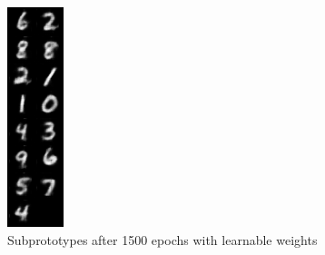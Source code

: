 \begin{figure}
    \centering
    \includegraphics{img/subprot44.png}
    \caption{Subprototypes after 1500 epochs with learnable weights}
    \label{appendixprots}
\end{figure}